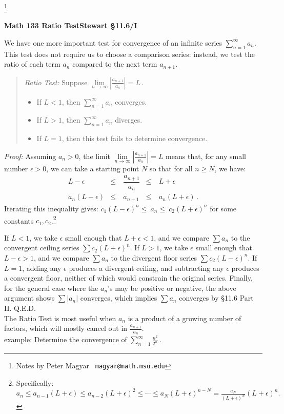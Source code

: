 \documentclass[11pt]{article}
\newcommand{\ds}{\displaystyle}
\begin{document}
\footnote[0]{Notes by Peter Magyar \ {\tt magyar@math.msu.edu}}
\vspace{-1em}

\centerline{\bf Math 133\hspace{1.5em} \hfill{\Large\bf
Ratio Test}\hfill Stewart \S11.6/I}
\vspace{1em}

\noindent 
We have one more important test for convergence of 
an infinite series $\sum_{n=1}^\infty a_n$. 
This test does not require us to 
choose a comparison series: instead, we test the ratio of 
each term $a_n$ compared to the next term $a_{n+1}$.
\\[-1em]
\begin{quote}
{\it Ratio Test:} Suppose $\ds\lim\limits_{n\to\infty} \left|\frac{a_{n+1}}{a_n}\right|=L$\,.
\\[-1em]
\begin{itemize}
\item If $L<1$, then $\sum_{n=1}^\infty a_n$ converges.
\item If $L>1$, then $\sum_{n=1}^\infty a_n$ diverges.
\item If $L=1$, then this test fails to determine convergence.
\end{itemize}

\end{quote}

\noindent
{\it Proof:} Assuming $a_n>0$, the limit $\lim\limits_{n\to\infty} \left|\frac{a_{n+1}}{a_n}\right|=L$ means that, for any small number $\epsilon>0$,
we can take a starting point $N$ so that  for all $n\geq N$, we have:
$$\begin{array}{ccccc}
L{-}\epsilon & \leq\ & \dfrac{a_{n+1}}{a_n}& \leq\ &  L{+}\epsilon 
\\[1em]
a_n(L{-}\epsilon) & \leq\ &  a_{n+1}& \leq\ &  a_n(L{+}\epsilon)\,.
\end{array}$$
Iterating this inequality gives: 
$
c_1(L{-}\epsilon)^n  \leq\  a_{n} \leq\   c_2(L{+}\epsilon)^n
$
for some constants $c_1,c_2$.\footnote{
Specifically:
$
a_{n}\leq a_{n-1}(L{+}\epsilon)\leq a_{n-2}(L{+}\epsilon)^2
\leq\cdots\leq a_N(L{+}\epsilon)^{n-N} = \frac{a_N}{(L{+}\epsilon)^{N}} (L{+}\epsilon)^n.
$
}

If $L<1$, we take $\epsilon$ small enough
that $L{+}\epsilon<1$, and we compare $\sum a_n$ to the convergent ceiling
series $\sum c_2(L{+}\epsilon)^n$. 
If $L>1$, we take $\epsilon$ small enough
that $L{-}\epsilon>1$, and we compare $\sum a_n$ to the divergent floor
series $\sum c_2(L{-}\epsilon)^n$. 
If $L=1$, adding any $\epsilon$ produces a divergent ceiling, and subtracting any $\epsilon$ produces a convergent floor, neither of which would constrain the original  series.
Finally, for the general case where the $a_n$'s may be positive or negative, 
the above argument shows $\sum |a_n|$ converges, which implies $\sum a_n$ converges by \S11.6 Part II. Q.E.D.
 \\[.9em]
 The Ratio Test is most useful when $a_n$ is a product of a growing number of factors, which will mostly cancel out in $\frac{a_{n+1}}{a_n}$.
 \\[.2em]
 {\sc example:} Determine the convergence of $\ds\sum_{n=1}^\infty \frac{n^2}{2^n}$\,.
 
\end{document}
